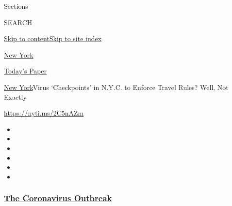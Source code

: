 Sections

SEARCH

\protect\hyperlink{site-content}{Skip to
content}\protect\hyperlink{site-index}{Skip to site index}

\href{https://www.nytimes3xbfgragh.onion/section/nyregion}{New York}

\href{https://myaccount.nytimes3xbfgragh.onion/auth/login?response_type=cookie\&client_id=vi}{}

\href{https://www.nytimes3xbfgragh.onion/section/todayspaper}{Today's
Paper}

\href{/section/nyregion}{New York}\textbar{}Virus `Checkpoints' in
N.Y.C. to Enforce Travel Rules? Well, Not Exactly

\url{https://nyti.ms/2C5nAZm}

\begin{itemize}
\item
\item
\item
\item
\item
\item
\end{itemize}

\hypertarget{the-coronavirus-outbreak}{%
\subsubsection{\texorpdfstring{\href{https://www.nytimes3xbfgragh.onion/news-event/coronavirus?name=styln-coronavirus-national\&region=TOP_BANNER\&block=storyline_menu_recirc\&action=click\&pgtype=Article\&impression_id=afaf62b0-f4bb-11ea-bfcd-b5364c666c0c\&variant=undefined}{The
Coronavirus
Outbreak}}{The Coronavirus Outbreak}}\label{the-coronavirus-outbreak}}

